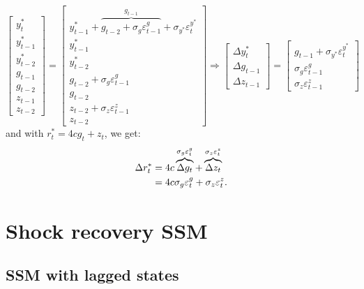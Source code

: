 \documentclass[a4paper,12pt]{article}
\newcommand{\vsp}[1]{\vspace*{#1mm}}\newcommand{\hsp}[1]{\hspace*{#1mm}}  }
\begin{document}
\begin{equation}
\begin{bmatrix}
y_{t}^{\ast } \\
y_{t-1}^{\ast } \\
y_{t-2}^{\ast } \\
g_{t-1} \\
g_{t-2} \\
z_{t-1} \\
z_{t-2}%
\end{bmatrix}%
=%
\begin{bmatrix}
y_{t-1}^{\ast }+\overbrace{g_{t-2}+\sigma _{g}\varepsilon _{t-1}^{g}}%
^{g_{t-1}}+\sigma _{y^{\ast }}\varepsilon _{t}^{y^{\ast }} \\
y_{t-1}^{\ast } \\
y_{t-2}^{\ast } \\
g_{t-2}+\sigma _{g}\varepsilon _{t-1}^{g} \\
g_{t-2} \\
z_{t-2}+\sigma _{z}\varepsilon _{t-1}^{z} \\
z_{t-2}%
\end{bmatrix}%
\Rightarrow
\begin{bmatrix}
\Delta y_{t}^{\ast } \\
\Delta g_{t-1} \\
\Delta z_{t-1}%
\end{bmatrix}%
=%
\begin{bmatrix}
g_{t-1}+\sigma _{y^{\ast }}\varepsilon _{t}^{y^{\ast }} \\
\sigma _{g}\varepsilon _{t-1}^{g} \\
\sigma _{z}\varepsilon _{t-1}^{z}%
\end{bmatrix}
\label{lwb}
\end{equation}%
and with $r_{t}^{\ast }=4cg_{t}+z_{t}$, we get: \vsp{-4}
\begin{align}
\Delta r_{t}^{\ast }& =4c\overbrace{\Delta g_{t}}^{\sigma _{g}\varepsilon
_{t}^{g}}+\overbrace{\Delta z_{t}}^{\sigma _{z}\varepsilon _{t}^{z}}  \notag
\\
& =4c\sigma _{g}\varepsilon _{t}^{g}+\sigma _{z}\varepsilon _{t}^{z}.
\label{drstar}
\end{align}

\section{Shock recovery SSM}

\subsection{SSM with lagged states}
\end{document}

